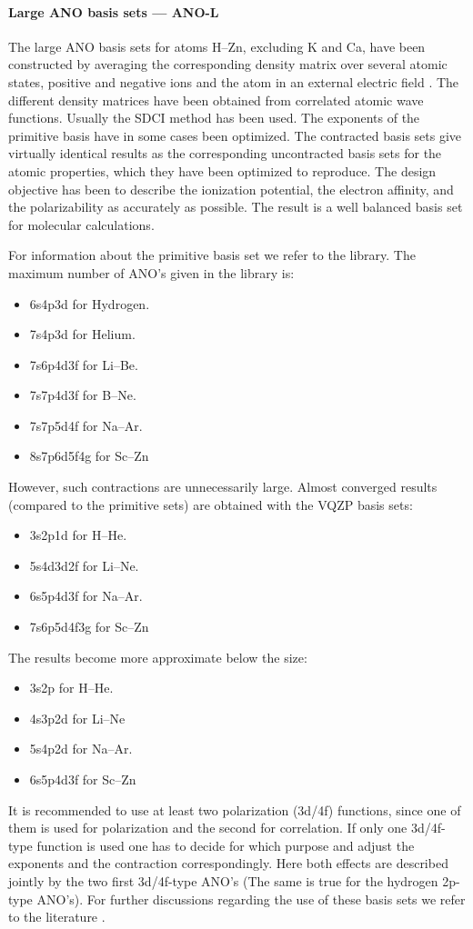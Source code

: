 \paragraph{Large ANO basis sets --- ANO-L}
 
The large ANO basis sets for atoms H--Zn, excluding K and Ca,
have been constructed by averaging the
corresponding density matrix over several atomic states, positive and
negative ions and the atom in an external
electric field \cite{anoI,anoII,anoIII}.
The different density matrices have been obtained from correlated
atomic wave functions. Usually the SDCI method has been used. The
exponents of the primitive basis have in some cases been optimized.
The contracted basis sets give virtually identical results as the
corresponding uncontracted basis sets for the atomic properties, which
they have been optimized to reproduce. The design objective has been
to describe the ionization potential, the electron affinity, and the
polarizability as accurately as possible. The result is a well
balanced basis set for molecular calculations. 

For information about the primitive basis set we refer to the library.
The maximum number of ANO's given in the library is:
\begin{itemize}
\item 6s4p3d for Hydrogen.
\item 7s4p3d for Helium.
\item 7s6p4d3f for Li--Be.
\item 7s7p4d3f for B--Ne.
\item 7s7p5d4f for Na--Ar.
\item 8s7p6d5f4g for Sc--Zn
\end{itemize}
However, such contractions are unnecessarily large. Almost converged
results (compared to the primitive sets) are obtained with the VQZP basis
sets:
\begin{itemize}
\item 3s2p1d for H--He.
\item 5s4d3d2f for Li--Ne.
\item 6s5p4d3f for Na--Ar.
\item 7s6p5d4f3g for Sc--Zn
\end{itemize}
The results become more approximate below the size:
\begin{itemize}
\item 3s2p for H--He.
\item 4s3p2d for Li--Ne
\item 5s4p2d for Na--Ar.
\item 6s5p4d3f for Sc--Zn
\end{itemize}
It is recommended to use at least two polarization
(3d/4f) functions, since one of them is used for polarization and the
second for correlation. If only one 3d/4f-type function is used one has
to decide for which purpose and adjust the exponents and the
contraction correspondingly. Here both effects are described jointly
by the two first 3d/4f-type ANO's (The same is true for the hydrogen
2p-type ANO's). For further discussions regarding the use of these
basis sets we refer to the
literature \cite{anoI,anoII,anoIII}.

